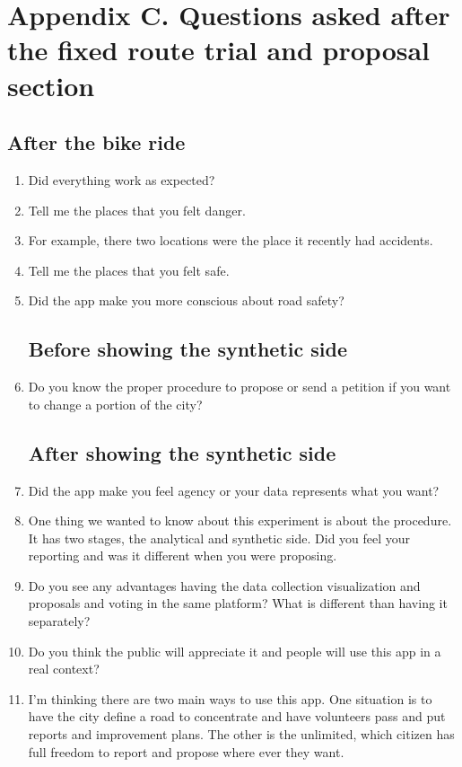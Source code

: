 \chapter{Appendix C. Questions asked after the fixed route trial and
proposal section}

\label{appc:afterquestions}

\section{After the bike ride}
\begin{enumerate}
\item Did everything work as expected?
\item Tell me the places that you felt danger.
\item For example, there two locations were the place it recently had accidents. 
\item Tell me the places that you felt safe.
\item Did the app make you more conscious about road safety? 
\section{Before showing the synthetic side}
\item Do you know the proper procedure to propose or send a petition if you want to change a portion of the city?
\section{After showing the synthetic side}
\item Did the app make you feel agency or your data represents what you want?
\item One thing we wanted to know about this experiment is about the procedure. It has two stages, the analytical and synthetic side. Did you feel your reporting and was it different when you were proposing. 
\item Do you see any advantages having the data collection visualization and proposals and voting in the same platform? What is different than having it separately?
\item Do you think the public will appreciate it and people will use this app in a real context?
\item I'm thinking there are two main ways to use this app. One situation
  is to have the city define a road to concentrate and have volunteers pass
  and put reports and improvement plans. The other is the unlimited, which
  citizen has full freedom to report and propose where ever they want.
\end{enumerate}